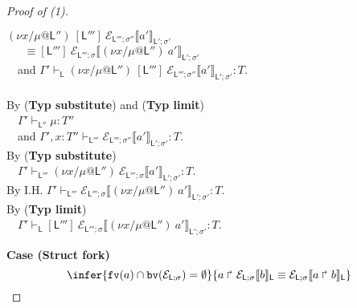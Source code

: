 \documentclass{sigplanconf}
\newcommand{\lab}{\mathsf L}
\newcommand{\new}[2]{(\nu #1)\:#2}
\newcommand{\fv}{\mathtt{fv}}
\newcommand{\bv}{\mathtt{bv}}
\newcommand{\fork}[2]{#1\Rsh\:\!#2}
\newcommand{\eval}[3]{\mathsf{let}~#1=#2~\mathsf{in}~#3}
\newcommand{\llctx}[3]{\mathcal E_{#1}\llbracket#2\rrbracket_{#3}}
\newcommand{\sctx}[2]{\mathcal E_{\lab;\sigma}\llbracket#1\rrbracket_{#2}}
\newcommand{\trule}[1]{(\textbf{Typ #1})}
\begin{document}
\begin{proof}[Proof of (1)]
\begin{itemize}
$\new{x/\mu@\lab''}[\lab''']~\llctx{\lab''';\sigma''}{a'}{\lab';\sigma'}$\\
$~~~~~~~ \equiv[\lab''']~{\llctx{\lab''';\sigma}{\new{x/\mu@\lab''}a'}{\lab';\sigma'}}$\\
$~~~$ and $\Gamma' \vdash_{\lab} \new{x/\mu@\lab''}[\lab''']~{\llctx{\lab''';\sigma''}{a'}{\lab';\sigma'}}
  : T$.\\
  \\
By \trule{substitute} and \trule{limit} \\
$~~~$ $\Gamma' \vdash_{\lab''} \mu
  : T''$ \\
$~~~$ and $\Gamma', x: T'' \vdash_{\lab'''} \llctx{\lab''';\sigma''}{a'}{\lab';\sigma'}
  : T$.\\
By \trule{substitute} \\
$~~~$ $\Gamma' \vdash_{\lab'''} \new{x/\mu@\lab''}\llctx{\lab''';\sigma}{a'}{\lab';\sigma'}
  : T$.\\
By I.H. $\Gamma' \vdash_{\lab'''} \llctx{\lab''';\sigma}{\new{x/\mu@\lab''}a'}{\lab';\sigma'}
  : T$.\\
By \trule{limit} \\
$~~~$ $\Gamma' \vdash_{\lab} [\lab''']~{\llctx{\lab''';\sigma}{\new{x/\mu@\lab''}a'}{\lab';\sigma'}}
  : T$.
\end{itemize}
{\bf Case (Struct fork)}
$$\infer
    {\fv(a) \cap \bv(\mathcal E_{\lab;\sigma}) = \emptyset}
    {\fork a \sctx b \lab\equiv \sctx{\fork a b} \lab}
$$
\end{proof}
\end{document}
